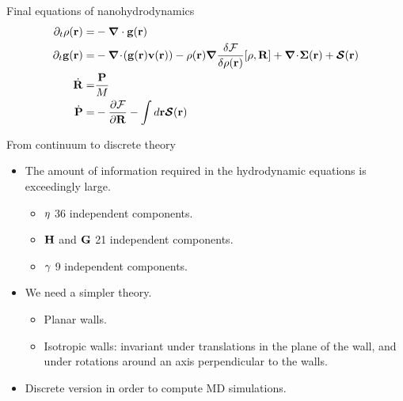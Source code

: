 \documentclass{beamer}
\newcommand{\esc}{\!\cdot\!}
\begin{document}
\begin{frame}{Final equations of nanohydrodynamics}
\begin{align}
\partial_t\rho({\bf r})=&-\boldsymbol{\nabla}\cdot{\bf g}({\bf r})
\nonumber\\
\partial_t{\bf g}({\bf r})=&-\boldsymbol{\nabla}\esc{\left({\bf g}({\bf r}){\bf v}({\bf r})\right)}
-\rho({\bf r})\boldsymbol{\nabla}\frac{\delta {\cal F}}{\delta\rho({\bf r})}[\rho,{\bf R}]
+\boldsymbol{\nabla}\esc\boldsymbol{\Sigma}({\bf r})+\boldsymbol{{\cal S}}({\bf r})
\nonumber\\
\dot{\bf R}=&\frac{\bf P}{M}
\nonumber\\
\dot{\bf P}=&-\frac{\partial {\cal F}}{\partial {\bf R}}
-\int d {{\bf r}}\boldsymbol{{\cal S}}({\bf r})
\nonumber
\end{align}

\end{frame}

\begin{frame}{From continuum to discrete theory}
  \begin{itemize}
    \item The \alert{amount of information} required in the hydrodynamic equations is exceedingly large.
      \begin{itemize}
        \item ${\bf \eta}$ 36 independent components. 
        \item ${\bf H}$ and ${\bf G}$ 21 independent components. 
        \item ${\bf \gamma}$ 9 independent components. 
        \end{itemize}
    \item We need a \alert{simpler theory}. 
      \begin{itemize}
        \item Planar walls. 
        \item Isotropic walls: invariant under translations in the plane of the wall, and under rotations around an axis perpendicular to the walls.
        \end{itemize}
    \item \alert{Discrete version} in order to compute MD simulations.
    \end{itemize}
\end{frame}
\end{document}
